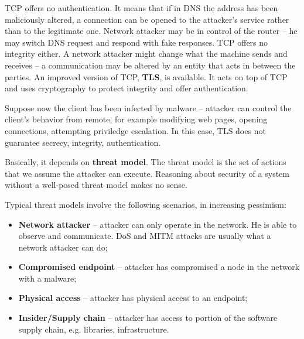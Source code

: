 \documentclass[10pt]{book}
\begin{document}
TCP offers no authentication. It means that if in DNS the address has been
maliciously altered, a connection can be opened to the attacker's service
rather than to the legitimate one. Network attacker may be in control of the
router \--- he may switch DNS request and respond with fake responses. TCP
offers no integrity either. A network attacker might change what the machine
sends and receives \--- a communication may be altered by an entity that acts
in between the parties. An improved version of TCP, \textbf{TLS}, is available.
It acts on top of TCP and uses cryptography to protect integrity and offer
authentication.

Suppose now the client has been infected by malware \--- attacker can control
the client's behavior from remote, for example modifying web pages, opening
connections, attempting priviledge escalation. In this case, TLS does not
guarantee secrecy, integrity, authentication. 

Basically, it depends on \textbf{threat model}. The threat model is the set of
actions that we assume the attacker can execute. Reasoning about security of a
system without a well-posed threat model makes no sense.

Typical threat models involve the following scenarios, in increasing pessimism:
\begin{itemize}
    \item \textbf{Network attacker} \--- attacker can only operate in the
        network. He is able to observe and communicate. DoS and MITM attacks
        are usually what a network attacker can do;
    \item \textbf{Compromised endpoint} \--- attacker has compromised a node in
        the network with a malware;
    \item \textbf{Physical access} \--- attacker has physical access to an
        endpoint;
    \item \textbf{Insider/Supply chain} \--- attacker has access to portion of
        the software supply chain, e.g. libraries, infrastructure.
\end{itemize}
\end{document}
